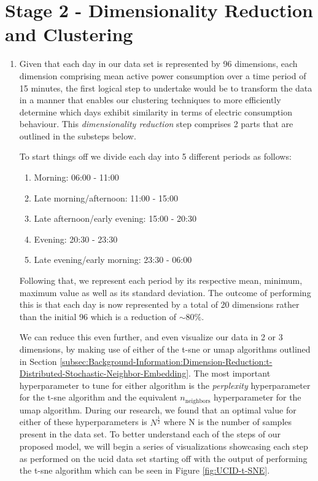 \section{Stage 2 - Dimensionality Reduction and Clustering}
\label{sec:Methodology:Stage-2}
\begin{adjustwidth}{-1.65cm}{-0.0cm}%
    \begin{enumerate}[label=Step 2.\arabic*:, leftmargin=*]
    \setlength\itemsep{1em}
        \item Given that each day in our data set is represented by 96 dimensions, each dimension comprising mean active power consumption over a time period of 15 minutes, the first logical step to undertake would be to transform the data in a manner that enables our clustering techniques to more efficiently determine which days exhibit similarity in terms of electric consumption behaviour. This \textit{dimensionality reduction} step comprises 2 parts that are outlined in the substeps below.
        
        \noindent \newline To start things off we divide each day into 5 different periods as follows:
            \begin{enumerate}[label=\arabic*:, leftmargin=.75cm]
                \item Morning: 06:00 - 11:00
                \item Late morning/afternoon: 11:00 - 15:00
                \item Late afternoon/early evening: 15:00 - 20:30
                \item Evening: 20:30 - 23:30
                \item Late evening/early morning: 23:30 - 06:00
            \end{enumerate}
        
        \noindent \newline Following that, we represent each period by its respective mean, minimum, maximum value as well as its standard deviation. The outcome of performing this is that each day is now represented by a total of 20 dimensions rather than the initial 96 which is a reduction of $\sim 80\%$.
        
        \noindent \newline We can reduce this even further, and even visualize our data in 2 or 3 dimensions, by making use of either of the \gls{t-sne} or \gls{umap} algorithms outlined in Section \ref{subsec:Background-Information:Dimension-Reduction:t-Distributed-Stochastic-Neighbor-Embedding}. The most important hyperparameter to tune for either algorithm is the \textit{perplexity} hyperparameter for the \gls{t-sne} algorithm and the equivalent $n_{\text{neighbors}}$ hyperparameter for the \gls{umap} algorithm. During our research, we found that an optimal value for either of these hyperparameters is $N^{\frac{1}{2}}$ where N is the number of samples present in the data set. To better understand each of the steps of our proposed model, we will begin a series of visualizations showcasing each step as performed on the \gls{ucid} data set starting off with the output of performing the \gls{t-sne} algorithm which can be seen in Figure \ref{fig:UCID-t-SNE}.
        

\end{enumerate}
\end{adjustwidth}
